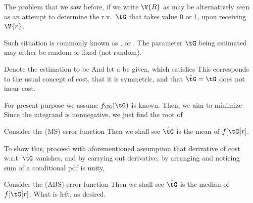  The problem that we saw before,  if we write \(\V{R}\) as  may be alternatively seen as an attempt to determine the r.v.\ \(\tG\) that takes value 0 or 1, upon receiving \(\V{r}\). 

 Such situation is commonly known as , or .
The parameter \(\tG\) being estimated may either be random or fixed (not random).

 Denote the estimation  to be  And let a  be given, which satisfies  This corresponds to the usual concept of cost, that it is symmetric, and that \(\hat{\tG} =\tG\) does not incur cost. \par
For present purpose we assume \(f_\TG(\tG)\) is known. Then, we aim to minimize  Since the integrand is nonnegative, we just find the root of 

 Consider the  (MS) error function  Then we shall see \(\hat{\tG}\) is the mean of \(f[\tG \big| r]\). \par
To show this, proceed with aforementioned assumption that derivative of cost w.r.t\ \(\hat{\tG}\) vanishes, and by carrying out derivative, by arranging and noticing sum of a conditional pdf is unity, 

 Consider the  (ABS) error function  Then we shall see \(\hat{\tG}\) is the median of \(f[\tG \big| r]\).  What is left,  as desired.

